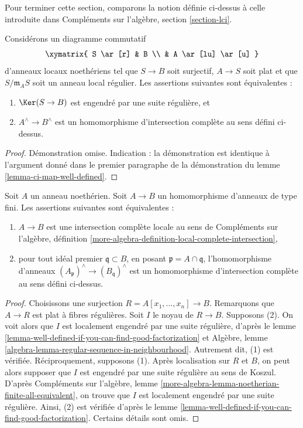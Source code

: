 \noindent
Pour terminer cette section, comparons la notion définie ci-dessus
à celle introduite dans
Compléments sur l'algèbre, section \ref{section-lci}.

\begin{lemma}
\label{lemma-well-defined-if-you-can-find-good-factorization}
Considérons un diagramme commutatif
$$
\xymatrix{
S \ar[r] & B \\
& A \ar[lu] \ar[u]
}
$$
d'anneaux locaux noethériens tel que $S \to B$ soit surjectif, $A \to S$ soit plat et
que $S/\mathfrak m_A S$ soit un anneau local régulier. Les assertions suivantes sont équivalentes :
\begin{enumerate}
\item $\Ker(S \to B)$ est engendré par une suite régulière, et
\item $A^\wedge \to B^\wedge$ est un homomorphisme d'intersection complète
au sens défini ci-dessus.
\end{enumerate}
\end{lemma}

\begin{proof}
Démonstration omise. Indication : la démonstration est identique à l'argument donné dans
le premier paragraphe de la démonstration du lemme \ref{lemma-ci-map-well-defined}.
\end{proof}

\begin{lemma}
\label{lemma-finite-type-lci-map}
Soit $A$ un anneau noethérien.
Soit $A \to B$ un homomorphisme d'anneaux de type fini.
Les assertions suivantes sont équivalentes :
\begin{enumerate}
\item $A \to B$ est une intersection complète locale au sens de
Compléments sur l'algèbre, définition
\ref{more-algebra-definition-local-complete-intersection},
\item pour tout idéal premier $\mathfrak q \subset B$, en posant
$\mathfrak p = A \cap \mathfrak q$, l'homomorphisme d'anneaux
$(A_\mathfrak p)^\wedge \to (B_\mathfrak q)^\wedge$ est
un homomorphisme d'intersection complète au sens défini ci-dessus.
\end{enumerate}
\end{lemma}

\begin{proof}
Choisissons une surjection $R = A[x_1, \ldots, x_n] \to B$.
Remarquons que $A \to R$ est plat à fibres régulières.
Soit $I$ le noyau de $R \to B$.
Supposons (2). On voit alors que
$I$ est localement engendré par une suite régulière,
d'après
le lemme \ref{lemma-well-defined-if-you-can-find-good-factorization}
et
Algèbre, lemme \ref{algebra-lemma-regular-sequence-in-neighbourhood}.
Autrement dit, (1) est vérifiée.
Réciproquement, supposons (1). Après localisation sur $R$ et $B$,
on peut alors supposer que $I$ est engendré par une suite régulière au sens de Koszul.
D'après Compléments sur l'algèbre, lemme
\ref{more-algebra-lemma-noetherian-finite-all-equivalent},
on trouve que $I$ est localement engendré par une suite régulière.
Ainsi, (2) est vérifiée d'après
le lemme \ref{lemma-well-defined-if-you-can-find-good-factorization}.
Certains détails sont omis.
\end{proof}

